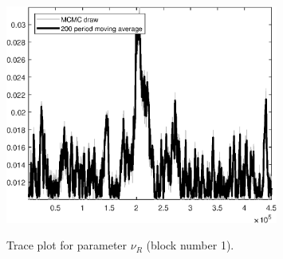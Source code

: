 \begin{figure}[H]
\centering
  \includegraphics[width=0.8\textwidth]{BRS_sectoral_wo_demand_shocks/graphs/TracePlot_nu_R_blck_1}\\
    \caption{Trace plot for parameter ${\nu_R}$ (block number 1).}
\end{figure}
